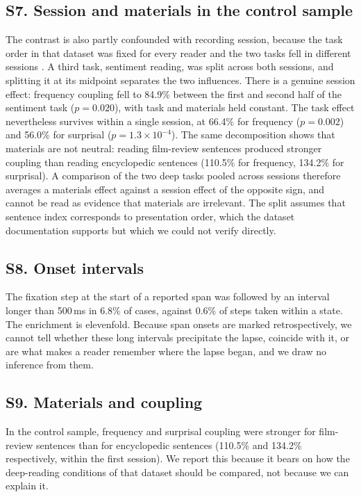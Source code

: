 \documentclass[11pt]{article}
\begin{document}
\subsection*{S7. Session and materials in the control sample}

The contrast is also partly confounded with recording session, because the task order in that
dataset was fixed for every reader and the two tasks fell in different sessions
\citep{hollenstein2018}. A third task, sentiment reading, was split across both sessions, and
splitting it at its midpoint separates the two influences. There is a genuine session effect:
frequency coupling fell to 84.9\% between the first and second half of the sentiment task
($p=0.020$), with task and materials held constant. The task effect nevertheless survives
within a single session, at 66.4\% for frequency ($p=0.002$) and 56.0\% for surprisal
($p=1.3\times10^{-4}$). The same decomposition shows that materials are not neutral: reading
film-review sentences produced stronger coupling than reading encyclopedic sentences (110.5\%
for frequency, 134.2\% for surprisal). A comparison of the two deep tasks pooled across sessions
therefore averages a materials effect against a session effect of the opposite sign, and cannot
be read as evidence that materials are irrelevant. The split assumes that sentence index
corresponds to presentation order, which the dataset documentation supports but which we could
not verify directly.

\subsection*{S8. Onset intervals}

The fixation step at the start of a reported span was followed by
an interval longer than 500\,ms in 6.8\% of cases, against 0.6\% of steps taken within a state.
The enrichment is elevenfold. Because span onsets are marked retrospectively, we cannot tell
whether these long intervals precipitate the lapse, coincide with it, or are what makes a
reader remember where the lapse began, and we draw no inference from them.

\subsection*{S9. Materials and coupling}

In the control sample, frequency and surprisal coupling were
stronger for film-review sentences than for encyclopedic sentences (110.5\% and 134.2\%
respectively, within the first session). We report this because it bears on how the
deep-reading conditions of that dataset should be compared, not because we can explain it.
\end{document}
